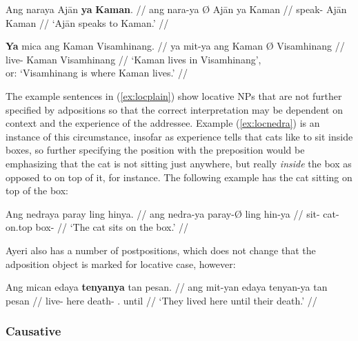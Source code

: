 \a\label{ex:locnara}\begingl
	\gla Ang naraya {} Ajān \textbf{ya} \textbf{Kaman}. //
	\glb ang nara-ya Ø Ajān ya Kaman //
	\glc \AgtT{} speak-\TsgM{} \Top{} Ajān \Loc{} Kaman //
	\glft `Ajān speaks to Kaman.' //
\endgl

\a\label{ex:locmit}\begingl
	\gla \textbf{Ya} mica ang Kaman {} Visamhinang. //
	\glb ya mit-ya ang Kaman Ø Visamhinang //
	\glc \LocT{} live-\TsgM{} \Aarg{} Kaman \Top{} Visamhinang //
	\glft `Kaman lives in Visamhinang',\\
		or: `Visamhinang is where Kaman lives.' //
\endgl

\xe

The example sentences in (\ref{ex:locplain}) show locative NPs that are not
further specified by adpositions so that the correct interpretation may be
dependent on context and the experience of the addressee. Example
(\ref{ex:locnedra}) is an instance of this circumstance, insofar as experience
tells that cats like to sit inside boxes, so further specifying the position
with the preposition  would be emphasizing that the
cat is not sitting just anywhere, but really \emph{inside} the box as opposed
to on top of it, for instance. The following example has the cat sitting on top
of the box:

\ex\begingl
	\gla Ang nedraya paray ling hinya. //
	\glb ang nedra-ya paray-Ø ling hin-ya //
	\glc \AgtT{} sit-\TsgM{} cat-\Top{} on.top box-\Loc{} //
	\glft `The cat sits on the box.' //
\endgl\xe

Ayeri also has a number of postpositions, which does not change that the adposition object is marked for locative case, however:

\ex\begingl
	\gla Ang mican edaya \textbf{tenyanya} tan pesan. //
	\glb ang mit-yan edaya tenyan-ya tan pesan //
	\glc \AgtT{} live-\TplM{} here death-\Loc{} \TplM{}.\Gen{} until //
	\glft `They lived here until their death.' //
\endgl\xe


\subsubsection{Causative}
\label{subsubsec:causative}

